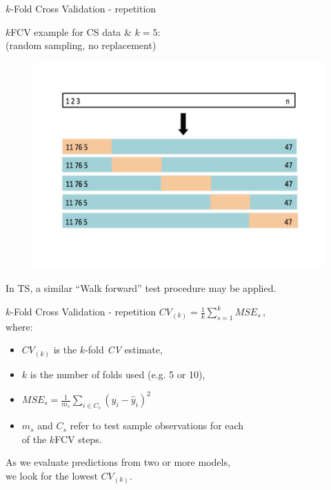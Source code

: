 \documentclass{beamer}
\begin{document}
\begin{frame}{$k$-Fold Cross Validation - repetition}
\begin{center}
$k$FCV example for CS data \& $k=5$: \\
(random sampling, no replacement)
\begin{figure}
\includegraphics[width=0.7\linewidth]{IMG/kFCV2.pdf}
\end{figure}
\vspace{-1cm}
In TS, a similar ``Walk forward'' test procedure may be applied.
\end{center}
\end{frame}
\begin{frame}{$k$-Fold Cross Validation - repetition}
$ \textit{CV}_{(k)}= \frac{1}{k}\displaystyle\sum_{s=1}^{k} \textit{MSE}_s \,,$
\vspace{0.3cm}
\\where:
\begin{itemize}
\item [~~] $\textit{CV}_{(k)}$ is the $k$-fold \textit{CV} estimate,
\item [~~] $k$ is the number of folds used (e.g. 5 or 10),
\item [~~] $\textit{MSE}_s = \frac{1}{m_s} \sum_{i \in C_s}^{}(y_i - \widehat{y}_i)^2 $ 
\item [~~] $m_s$ and $C_s$ refer to test sample  observations for each \\of the $k$FCV steps.
\end{itemize}
\vspace{0.3cm}
As we evaluate predictions from two or more models, 
\\we look for the lowest $\textit{CV}_{(k)}$. 
\end{frame}
\end{document}
